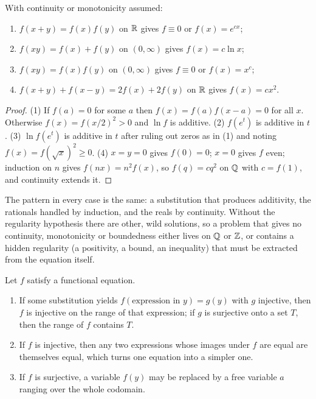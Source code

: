 \begin{proposition}
With continuity or monotonicity assumed:
\begin{enumerate}[nosep]
\item $f(x+y)=f(x)f(y)$ on $\mathbb{R}$ gives $f\equiv0$ or $f(x)=e^{cx}$;
\item $f(xy)=f(x)+f(y)$ on $(0,\infty)$ gives $f(x)=c\ln x$;
\item $f(xy)=f(x)f(y)$ on $(0,\infty)$ gives $f\equiv0$ or $f(x)=x^{c}$;
\item $f(x+y)+f(x-y)=2f(x)+2f(y)$ on $\mathbb{R}$ gives $f(x)=cx^2$.
\end{enumerate}
\end{proposition}

\begin{proof}
(1) If $f(a)=0$ for some $a$ then $f(x)=f(a)f(x-a)=0$ for all $x$. Otherwise $f(x)=f(x/2)^2>0$ and $\ln f$ is additive. (2) $f(e^t)$ is additive in $t$. (3) $\ln f(e^t)$ is additive in $t$ after ruling out zeros as in (1) and noting $f(x)=f(\sqrt x)^2\ge0$. (4) $x=y=0$ gives $f(0)=0$; $x=0$ gives $f$ even; induction on $n$ gives $f(nx)=n^2f(x)$, so $f(q)=cq^2$ on $\mathbb{Q}$ with $c=f(1)$, and continuity extends it.
\end{proof}

The pattern in every case is the same: a substitution that produces additivity, the rationals handled by induction, and the reals by continuity. Without the regularity hypothesis there are other, wild solutions, so a problem that gives no continuity, monotonicity or boundedness either lives on $\mathbb{Q}$ or $\mathbb{Z}$, or contains a hidden regularity (a positivity, a bound, an inequality) that must be extracted from the equation itself.

\begin{proposition}
Let $f$ satisfy a functional equation.
\begin{enumerate}[nosep]
\item If some substitution yields $f(\text{expression in }y)=g(y)$ with $g$ injective, then $f$ is injective on the range of that expression; if $g$ is surjective onto a set $T$, then the range of $f$ contains $T$.
\item If $f$ is injective, then any two expressions whose images under $f$ are equal are themselves equal, which turns one equation into a simpler one.
\item If $f$ is surjective, a variable $f(y)$ may be replaced by a free variable $a$ ranging over the whole codomain.
\end{enumerate}
\end{proposition}

